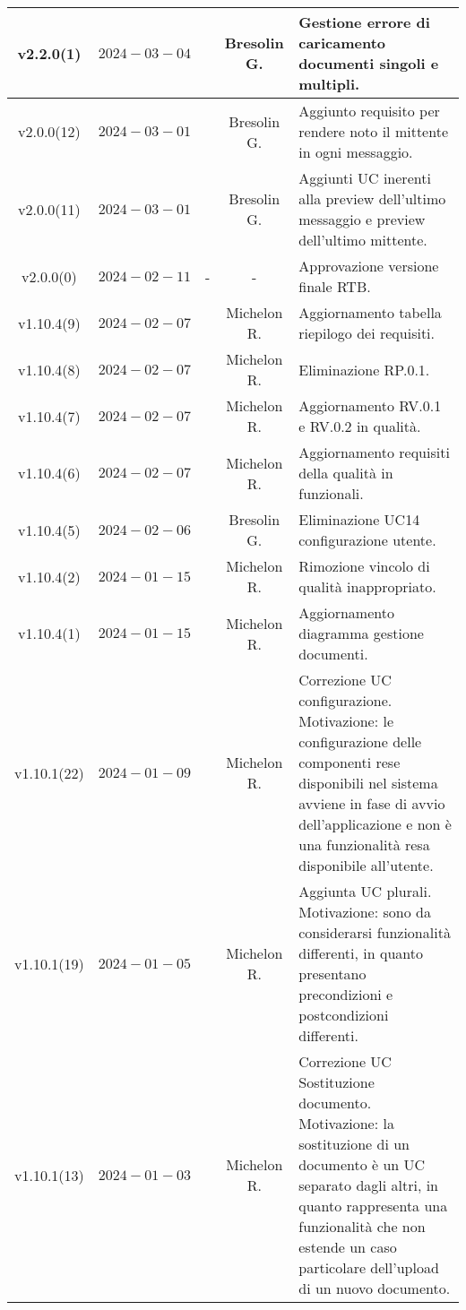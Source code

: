 {\begin{xltabular}{\textwidth}{c|c|c|c|X}
\hline
v2.2.0(1) & $2024-03-04$ &  & Bresolin G. & Gestione errore di caricamento documenti singoli e multipli.\\
\hline
v2.0.0(12) & $2024-03-01$ &  & Bresolin G. & Aggiunto requisito per rendere noto il mittente in ogni messaggio.\\
\hline
v2.0.0(11) & $2024-03-01$ &  & Bresolin G. & Aggiunti UC inerenti alla preview dell'ultimo messaggio e preview dell'ultimo mittente.\\
\hline
v2.0.0(0) & $2024-02-11$ & - & - & Approvazione versione finale RTB.\\
\hline
v1.10.4(9) & $2024-02-07$ &  & Michelon R. & Aggiornamento tabella riepilogo dei requisiti.\\
\hline
v1.10.4(8) & $2024-02-07$ &  & Michelon R. & Eliminazione RP.0.1.\\
\hline
v1.10.4(7) & $2024-02-07$ &  & Michelon R. & Aggiornamento RV.0.1 e RV.0.2 in qualità.\\
\hline
v1.10.4(6) & $2024-02-07$ &  & Michelon R. & Aggiornamento requisiti della qualità in funzionali.\\
\hline
v1.10.4(5) & $2024-02-06$ &  & Bresolin G. & Eliminazione UC14 configurazione utente.\\
\hline
v1.10.4(2) & $2024-01-15$ &  & Michelon R. & Rimozione vincolo di qualità inappropriato.\\
\hline
v1.10.4(1) & $2024-01-15$ &  & Michelon R. & Aggiornamento diagramma gestione documenti.\\
\hline
v1.10.1(22) & $2024-01-09$ &  & Michelon R. & Correzione UC configurazione. Motivazione: le configurazione delle componenti rese disponibili nel sistema avviene in fase di avvio dell'applicazione e non è una funzionalità resa disponibile all'utente.\\
\hline
v1.10.1(19) & $2024-01-05$ &  & Michelon R. & Aggiunta UC plurali. Motivazione: sono da considerarsi funzionalità differenti, in quanto presentano precondizioni e postcondizioni differenti.\\
\hline
v1.10.1(13) & $2024-01-03$ &  & Michelon R. & Correzione UC Sostituzione documento. Motivazione: la sostituzione di un documento è un UC separato dagli altri, in quanto rappresenta una funzionalità che non estende un caso particolare dell'upload di un nuovo documento.\\

\end{xltabular}}
